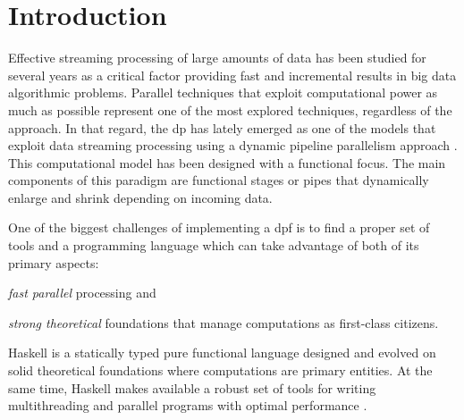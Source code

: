 \section{Introduction}\label{intro}
Effective streaming processing of large amounts of data has been studied for several years \cite{exploiting, onthefly}  as a critical factor providing fast and incremental results in big data algorithmic problems. 
Parallel techniques that exploit computational power as much as possible represent one of the most explored techniques, regardless of the approach.
In that regard, the \acrfull{dp} \cite{dpdef} has lately emerged as one of the models that exploit data streaming processing using a dynamic pipeline parallelism approach \cite{onthefly}. 
This computational model has been designed with a functional focus. The main components of this paradigm are functional stages or pipes that dynamically enlarge and shrink depending on incoming data.  

One of the biggest challenges of implementing a \acrfull{dpf} is to find a proper set of tools and a programming language which can take advantage of both of its primary aspects: \begin{inparaenum}[i\upshape)]
\item  \emph{fast parallel} processing and 
\item  \emph{strong theoretical} foundations that manage computations as first-class citizens.
 \end{inparaenum}
Haskell is a statically typed pure functional language  
designed and evolved on solid theoretical foundations where computations are primary entities. At the same time, Haskell makes available a robust set of tools for writing multithreading and parallel programs with optimal performance \cite{parallelbook, monadpar}.

